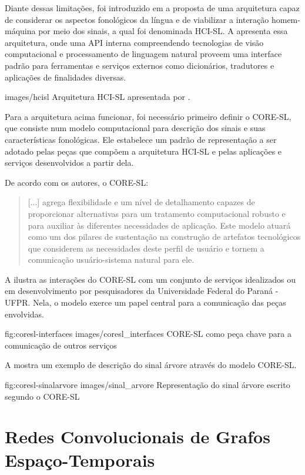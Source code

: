 Diante dessas limitações, foi introduzido em \cite{antunes-hcisl-2011} a proposta de uma arquitetura capaz de considerar os aspectos fonológicos da língua e de viabilizar a interação homem-máquina por meio dos sinais, a qual foi denominada HCI-SL. A  apresenta essa arquitetura, onde uma API interna compreendendo tecnologias de visão computacional e processamento de linguagem natural proveem uma interface padrão para ferramentas e serviços externos como dicionários, tradutores e aplicações de finalidades diversas.

    {images/hcisl}
    {Arquitetura HCI-SL apresentada por \cite{antunes-hcisl-2011}.}

Para a arquitetura acima funcionar, foi necessário primeiro definir o CORE-SL, que consiste num modelo computacional para descrição dos sinais e suas características fonológicas. Ele estabelece um padrão de representação a ser adotado pelas peças que compõem a arquitetura HCI-SL e pelas aplicações e serviços desenvolvidos a partir dela.

De acordo com os autores, o CORE-SL:

\begin{quote}
[...] agrega flexibilidade e um nível de detalhamento capazes de proporcionar alternativas para um tratamento computacional robusto e para auxiliar às diferentes necessidades de aplicação. Este modelo atuará como um dos pilares de sustentação na construção de artefatos tecnológicos que considerem as necessidades deste perfil de usuário e tornem a comunicação usuário-sistema natural para ele. \cite{antunes-2011}
\end{quote}

 A  ilustra as interações do CORE-SL com um conjunto de serviços idealizados ou em desenvolvimento por pesquisadores da Universidade Federal do Paraná - UFPR. Nela, o modelo exerce um papel central para a comunicação das peças envolvidas.

\image
    {fig:coresl-interfaces}
    {images/coresl_interfaces}
    {CORE-SL como peça chave para a comunicação de outros serviços}

A  mostra um exemplo de descrição do sinal árvore através do modelo CORE-SL.

\image
    {fig:coresl-sinalarvore}
    {images/sinal_arvore}
    {Representação do sinal árvore escrito segundo o CORE-SL}
    

\section{Redes Convolucionais de Grafos Espaço-Temporais}

